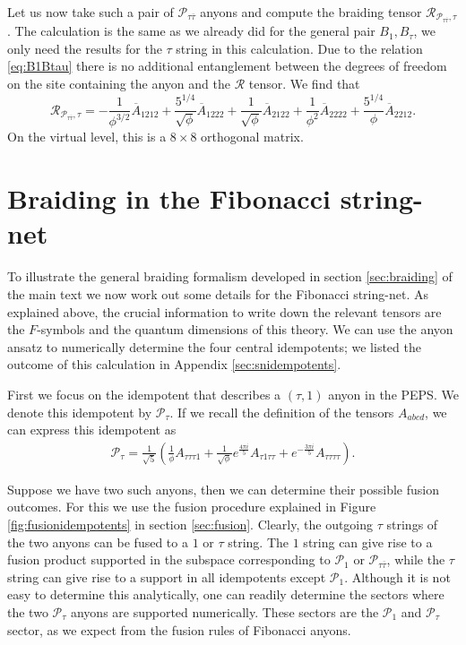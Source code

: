 \documentclass[12 pt]{article}
\begin{document}
Let us now take such a pair of $\mathcal{P}_{\tau\overline{\tau}}$ anyons and compute the braiding tensor $\mathcal{R}_{\mathcal{P}_{\tau\overline{\tau}},\tau}$. The calculation is the same as we already did for the general pair $B_1,B_{\tau}$, we only need the results for the $\tau$ string in this calculation. Due to the relation \eqref{eq:B1Btau} there is no additional entanglement between the degrees of freedom on the site containing the anyon and the $\mathcal{R}$ tensor. We find that
$$
    \mathcal{R}_{\mathcal{P}_{\tau\overline{\tau}},\tau}=
    -\frac{1}{\phi^{3/2}}\overline{A}_{1212}+\frac{5^{1/4}}{\sqrt{\phi}}\overline{A}_{1222}+\frac{1}{\sqrt{\phi}}\overline{A}_{2122}+\frac{1}{\phi^2}\overline{A}_{2222}+\frac{5^{1/4}}{\phi}\overline{A}_{2212}.
$$
On the virtual level, this is a $8\times 8$ orthogonal matrix.

\section{Braiding in the Fibonacci string-net} \label{app:fibonacci}
To illustrate the general braiding formalism developed in section \ref{sec:braiding} of the main text we now work out some details for the Fibonacci string-net. As explained above, the crucial information to write down the relevant tensors are the $F$-symbols and the quantum dimensions of this theory. We can use the anyon ansatz to numerically determine the four central idempotents; we listed the outcome of this calculation in Appendix \ref{sec:snidempotents}.

First we focus on the idempotent that describes a $(\tau,1)$ anyon in the PEPS. We denote this idempotent by $\mathcal{P}_{\tau}$. If we recall the definition of the tensors $A_{abcd}$, we can express this idempotent as
\begin{align*}
    \mathcal{P}_{\tau}=\frac{1}{\sqrt{5}}\left(\frac{1}{\phi}A_{\tau\tau\tau 1}+\frac{1}{\sqrt{\phi}}e^{\frac{4\pi i}{5}}A_{\tau 1\tau\tau}+e^{-\frac{3\pi i}{5}}A_{\tau\tau\tau\tau}\right).
\end{align*}

Suppose we have two such anyons, then we can determine their possible fusion outcomes. For this we use the fusion procedure explained in Figure \ref{fig:fusionidempotents} in section \ref{sec:fusion}. Clearly, the outgoing $\tau$ strings of the two anyons can be fused to a $1$ or $\tau$ string. The $1$ string can give rise to a fusion product supported in the subspace corresponding to $\mathcal{P}_1$ or $\mathcal{P}_{\tau\overline{\tau}}$, while the $\tau$ string can give rise to a support in all idempotents except $\mathcal{P}_1$. Although it is not easy to determine this analytically, one can readily determine the sectors where the two $\mathcal{P}_{\tau}$ anyons are supported numerically. These sectors are the $\mathcal{P}_1$ and $\mathcal{P}_{\tau}$ sector, as we expect from the fusion rules of Fibonacci anyons.
\end{document}
